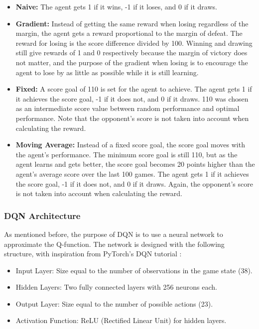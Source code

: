 \documentclass[12pt]{article}
\begin{document}
\begin{itemize}
    \item \textbf{Naive:} The agent gets 1 if it wins, -1 if it loses, and 0 if it draws.
    \item \textbf{Gradient:} Instead of getting the same reward when losing regardless of the margin, the agent gets a reward proportional to the margin of defeat. The reward for losing is the score difference divided by 100. Winning and drawing still give rewards of 1 and 0 respectively because the margin of victory does not matter, and the purpose of the gradient when losing is to encourage the agent to lose by as little as possible while it is still learning.
    \item \textbf{Fixed:} A score goal of 110 is set for the agent to achieve. The agent gets 1 if it achieves the score goal, -1 if it does not, and 0 if it draws. 110 was chosen as an intermediate score value between random performance and optimal performance. Note that the opponent's score is not taken into account when calculating the reward.
    \item \textbf{Moving Average:} Instead of a fixed score goal, the score goal moves with the agent's performance. The minimum score goal is still 110, but as the agent learns and gets better, the score goal becomes 20 points higher than the agent's average score over the last 100 games. The agent gets 1 if it achieves the score goal, -1 if it does not, and 0 if it draws. Again, the opponent's score is not taken into account when calculating the reward.
\end{itemize}

\subsubsection{DQN Architecture}

As mentioned before, the purpose of DQN is to use a neural network to approximate the Q-function. The network is designed with the following structure, with inspiration from PyTorch's DQN tutorial \cite{dqn}:
\begin{itemize}
    \item Input Layer: Size equal to the number of observations in the game state (38).
    \item Hidden Layers: Two fully connected layers with 256 neurons each.
    \item Output Layer: Size equal to the number of possible actions (23).
    \item Activation Function: ReLU (Rectified Linear Unit) for hidden layers.
\end{itemize}
\end{document}
